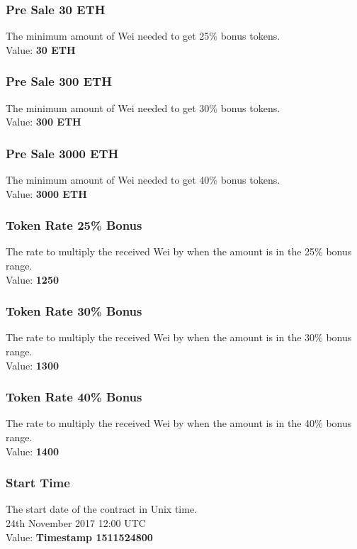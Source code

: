 \documentclass[11pt]{article} %
\begin{document}
\subsubsection{Pre Sale 30 ETH}
The minimum amount of Wei needed to get 25\% bonus tokens.\\
Value: \textbf{30 ETH}

\subsubsection{Pre Sale 300 ETH}
The minimum amount of Wei needed to get 30\% bonus tokens.\\
Value: \textbf{300 ETH}

\subsubsection{Pre Sale 3000 ETH}
The minimum amount of Wei needed to get 40\% bonus tokens.\\
Value: \textbf{3000 ETH}

\subsubsection{Token Rate 25\% Bonus}
The rate to multiply the received Wei by when the amount is in the 25\% bonus range.\\
Value: \textbf{1250}

\subsubsection{Token Rate 30\% Bonus}
The rate to multiply the received Wei by when the amount is in the 30\% bonus range.\\
Value: \textbf{1300}

\subsubsection{Token Rate 40\% Bonus}
The rate to multiply the received Wei by when the amount is in the 40\% bonus range.\\
Value: \textbf{1400}

\subsubsection{Start Time}
The start date of the contract in Unix time. \\
24th November 2017 12:00 UTC\\
Value: \textbf{Timestamp 1511524800}
\end{document}
